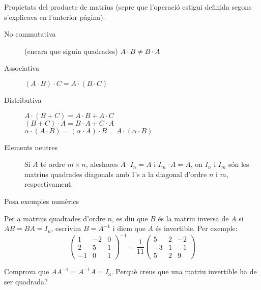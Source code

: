 \documentclass{beamer}
\begin{document}
\begin{frame}
Propietats del producte de matrius (sepre que l'operació estigui definida segons s'explicava en l'anterior pàgina):
\begin{description}
  \item[No commutativa] (encara que siguin quadrades) $A\cdot B \neq B\cdot A$
  \item[Associativa] $(A\cdot B) \cdot C=A\cdot (B \cdot C)$
  \item[Distributiva] $A\cdot (B+C) = A\cdot B + A \cdot C$\\ $(B+C)\cdot A = B\cdot A + C \cdot A$ \\ $ \alpha\cdot (A \cdot B) = (\alpha \cdot A) \cdot B = A \cdot (\alpha \cdot B)$
  \item[Elements neutres] Si $A$ té ordre $m \times n$, aleshores $A \cdot I_n = A$ i $I_m \cdot A = A$, on $I_n$ i $I_m$ són les matrius quadrades diagonals amb 1's a la diagonal d'ordre $n$ i $m$, respectivament.
\end{description}
\begin{exercici}{}
  Posa exemples numèrics
\end{exercici}
\end{frame}

\begin{frame}
\begin{definicio}
  Per a matrius quadrades d'ordre $n$, es diu que $B$ és la matriu inversa de $A$ si $AB=BA=I_n$, escrivim $B=A^{-1}$ i diem que $A$ és invertible. Per exemple:
  \[
  \begin{pmatrix}
    1 & -2 & 0\\
    2 & 5 & 1\\
    -1 & 0 & 1
  \end{pmatrix}^{-1}
  =
  \frac{1}{11}
  \begin{pmatrix}
    5 & 2 & -2 \\
    -3 & 1 & -1\\
    5 & 2 & 9
  \end{pmatrix}
  \]
\end{definicio}
\begin{exercici}{}
  Comprova que $AA^{-1}=A^{-1}A=I_3$. Perquè creus que una matriu invertible ha de ser quadrada?
\end{exercici}
\end{frame}
\end{document}
